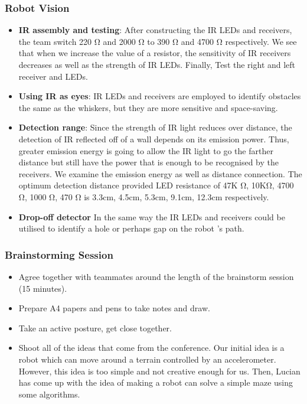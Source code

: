 \documentclass{article}
\begin{document}
\subsubsection{Robot Vision}
\begin{itemize}
    \item \textbf{IR assembly and testing}: After constructing the IR LEDs and receivers, the team switch 220 \si{\ohm} and 2000 \si{\ohm} to 390 \si{\ohm} and 4700 \si{\ohm} respectively. We see that when we increase the value of a resistor, the sensitivity of IR receivers decreases as well as the strength of IR LEDs. Finally, Test the right and left receiver and LEDs.
    \item \textbf{Using IR as eyes}: IR LEDs and receivers are employed to identify obstacles the same as the whiskers, but they are more sensitive and space-saving.
    \item \textbf{Detection range}: Since the strength of IR light reduces over distance, the detection of IR reflected off of a wall depends on its emission power. Thus, greater emission energy is going to allow the IR light to go the farther distance but still have the power that is enough to be recognised by the receivers. We examine the emission energy as well as distance connection. The optimum detection distance provided LED resistance of 47K \si{\ohm}, 10K\si{\ohm}, 4700 \si{\ohm}, 1000 \si{\ohm}, 470 \si{\ohm} is 3.3cm, 4.5cm, 5.3cm, 9.1cm, 12.3cm respectively.
    \item \textbf{Drop-off detector} In the same way the IR LEDs and receivers could be utilised to identify a hole or perhaps gap on the robot 's path.
\end{itemize} 

\subsubsection{Brainstorming Session}
\begin{itemize}
	\item Agree together with teammates around the length of the brainstorm session (15 minutes).
	\item Prepare A4 papers and pens to take notes and draw.
	\item Take an active posture, get close together.
	\item Shoot all of the ideas that come from the conference. Our initial idea is a robot which can move around a terrain controlled by an accelerometer. However, this idea is too simple and not creative enough for us. Then, Lucian has come up with the idea of making a robot can solve a simple maze using some algorithms.
\end{itemize}
\end{document}

